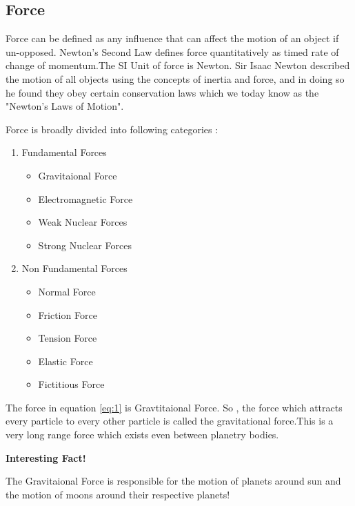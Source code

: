 \subsection{Force}
Force can be defined as any influence that can affect the motion of an object if un-opposed. Newton's Second Law defines force quantitatively as timed rate of change of momentum.The SI Unit of force is Newton. Sir Isaac Newton described the motion of all objects using the concepts of inertia and force, and in doing so he found they obey certain conservation laws which we today know as the "Newton's Laws of Motion". \par
Force is broadly divided into following categories : 
\begin{enumerate}
       \item Fundamental Forces
             \begin{itemize}
                    \item Gravitaional Force
                    \item Electromagnetic Force
                    \item Weak Nuclear Forces
                    \item Strong Nuclear Forces
             \end{itemize}
                    \item Non Fundamental Forces
                          \begin{itemize}
                                 \item Normal Force
                                 \item Friction Force
                                 \item Tension Force
                                 \item Elastic Force
                                 \item Fictitious Force
                          \end{itemize}
\end{enumerate}
The force in equation \ref{eq:1} is Gravtitaional Force. So , the force  which  attracts every particle to every other particle is called the gravitational force.This is a very long range force which exists even between planetry bodies. \par
\textbf{\bfseries \large Interesting Fact!} \par
The Gravitaional Force is responsible for the motion of planets around sun and the motion of moons around their respective planets! 
